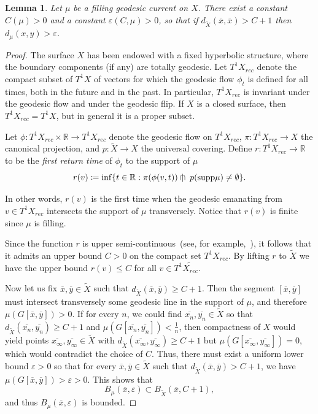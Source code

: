 \documentclass[12pt,article]{amsart}
\numberwithin{equation}{section}
\numberwithin{figure}{section}
\newtheorem{lemma}[equation]{Lemma}
\theoremstyle{definition}
\theoremstyle{plain}
\newcommand\R{\ensuremath{\mathbb{R}}}
\newcommand*{\wt}[1]{\widetilde{#1}}
\renewcommand{\epsilon}{\varepsilon}
\newcommand{\capt}{\cap\kern-0.7em|\kern0.7em}
\begin{document}
\begin{lemma}
Let $\mu$ be a filling geodesic current on $X$.
There exist a constant $C(\mu)>0$ and a constant $\epsilon(C,\mu)>0$, so that
if $d_{\wt{X}}(\overline{x},\overline{x}) > C+1$ then $d_{\mu}(x,y) > \epsilon$.
\label{lem:distancecompare}
\end{lemma}
\begin{proof}
The surface $X$ has been endowed with a fixed hyperbolic structure, where the boundary components (if any) are totally geodesic. Let $T^1 X_{\mathit{rec}}$ denote the compact subset of $T^1X$ of vectors for which the geodesic flow $\phi_t$ is defined for all times, both in the future and in the past.
In particular, $T^1 X_{\mathit{rec}}$ is invariant under the geodesic flow and under the geodesic flip. If $X$ is a closed surface, then $T^1 X_{\mathit{rec}} = T^1 X$, but in general it is a proper subset.

Let $\phi : T^1 X_{\mathit{rec}} \times \R \to T^1 X_{\mathit{rec}} $ denote the geodesic flow on $T^1 X_{\mathit{rec}} $, $\pi \colon T^1 X_{\mathit{rec}} \to X$ the canonical projection, and $p : \wt{X} \to X$ the universal covering. Define $r \colon T^1 X_{\mathit{rec}}  \to \mathbb{R}$ to be the \emph{first return time} of $\phi_t$ to the support of $\mu$
\[
r(v) \coloneqq \inf \{ t\in \R : \pi(\phi (v,t)) \capt p (\mathrm{supp} \mu) \neq \emptyset \}.
\]

In other words, $r(v)$ is the first time when the geodesic emanating from $v \in T^1 X_{\mathit{rec}}$ intersects the support of $\mu$ transversely. Notice that $r(v)$ is finite since $\mu$ is filling.

Since the function $r$ is upper semi-continuous~(see, for example,~\cite[Lemma~7.3]{MGT21:Smoothings}), it follows that it admits an upper bound $C >0$ on the compact set $T^1 X_{\mathit{rec}}$. By lifting $r$ to $\wt{X}$ we have the upper bound $r(v) \leq C$ for all $v \in T^1 \wt{X_{\mathit{rec}}}$.

Now let us fix $\overline{x}, \overline{y}\in \wt{X}$ such that $d_{\wt{X}} (\overline{x},\overline{y}) \geq C+1$. Then the segment $[\overline{x},\overline{y}]$ must intersect transversely some geodesic line in the support of $\mu$, and therefore
$\mu (G[\overline{x},\overline{y}]) > 0$. If for every $n$, we could find $\overline{x_n}, \overline{y_n} \in \wt{X}$ so that $d_{\wt{X}} (\overline{x_n},\overline{y_n}) \geq C+1$ and $\mu (G[\overline{x_n},\overline{y_n}]) < \frac{1}{n}$, then compactness of $X$ would yield points $\overline{x_{\infty}},\overline{y_{\infty}} \in \wt{X}$ with $d_{\wt{X}} (\overline{x_{\infty}},\overline{y_{\infty}}) \geq C+1$ but $\mu (G[\overline{x_{\infty}},\overline{y_{\infty}}])=0$, which would contradict the choice of $C$. Thus, there must exist a uniform lower bound $\epsilon>0$ so that
for every $\overline{x}, \overline{y}\in \wt{X}$ such that $d_{\wt{X}} (\overline{x},\overline{y}) > C+1$, we have $\mu (G[\overline{x},\overline{y}]) > \epsilon>0$.
This shows that
\[
B_{\mu}(\overline{x},\epsilon) \subset B_{\wt{X}}(\overline{x},C+1),
\]
and thus $B_{\mu}(\overline{x},\epsilon)$ is bounded.
\end{proof}
\end{document}
